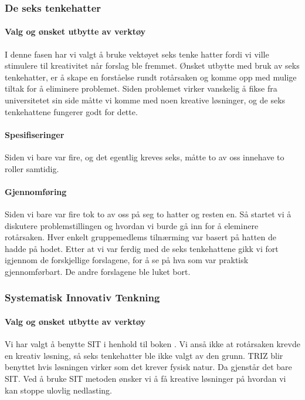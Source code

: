 \subsubsection{De seks tenkehatter}

\paragraph{Valg og ønsket utbytte av verktøy}
I denne fasen har vi valgt å bruke vektøyet seks tenke hatter fordi vi ville stimulere til kreativitet når forslag ble fremmet. Ønsket utbytte med bruk av seks tenkehatter, er å skape en forståelse rundt rotårsaken og komme opp med mulige tiltak for å eliminere problemet. Siden problemet virker vanskelig å fikse fra universitetet sin side måtte vi komme med noen kreative løsninger, og de seks tenkehattene fungerer godt for dette. 

\paragraph{Spesifiseringer}
Siden vi bare var fire, og det egentlig kreves seks, måtte to av oss innehave to roller samtidig. 

\paragraph{Gjennomføring}
Siden vi bare var fire tok to av oss på seg to hatter og resten en. Så startet vi å diskutere problemstillingen og hvordan vi burde gå inn for å eleminere rotårsaken. Hver enkelt gruppemedlems tilnærming var basert på hatten de hadde på hodet. Etter at vi var ferdig med de seks tenkehattene gikk vi fort igjennom de forskjellige forslagene, for å se på hva som var praktisk gjennomførbart. De andre forslagene ble luket bort. 


\subsubsection{Systematisk Innovativ Tenkning}

\paragraph{Valg og ønsket utbytte av verktøy}
Vi har valgt å benytte SIT i henhold til boken \cite{RCA}. Vi anså ikke at rotårsaken krevde en kreativ løsning, så seks tenkehatter ble ikke valgt av den grunn. TRIZ blir benyttet hvis løsningen virker som det krever fysisk natur. Da gjenstår det bare SIT. Ved å bruke SIT metoden ønsker vi å få kreative løsninger på hvordan vi kan stoppe ulovlig nedlasting.

